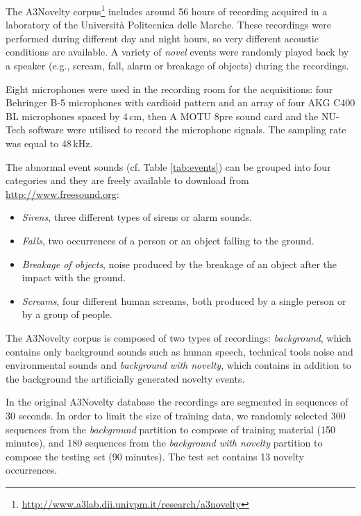 


The A3Novelty corpus\footnote{\label{note:a3}\url{http://www.a3lab.dii.univpm.it/research/a3novelty}} includes around 56 hours of recording acquired in a laboratory of the Università Politecnica delle Marche. 
These recordings were performed during different day and night hours, so very different acoustic conditions are available.
A variety of \emph{novel} events were randomly played back by a speaker (e.g., scream, fall, alarm or breakage of objects) during the recordings.

Eight microphones were used in the recording room for the acquisitions: four Behringer B-5 microphones with cardioid pattern and an
array of four AKG C400 BL microphones spaced by 4\,cm, then A MOTU 8pre sound card and the NU-Tech software were utilised 
to record the microphone signals. The sampling rate was equal to 48\,kHz.


The abnormal event sounds (cf.  Table \ref{tab:events}) can be grouped into four categories and they are freely available to download from \url{http://www.freesound.org}:
\begin{itemize}
	\item \textit{Sirens}, three different types of sirens or alarm sounds.
	\item \textit{Falls}, two occurrences of a person or an object falling to the ground.
	\item \textit{Breakage of objects}, noise produced by the breakage of an object after the impact with the ground.
	\item \textit{Screams}, four different human screams, both produced by a single person or by a group of people.
\end{itemize}


The A3Novelty corpus is composed of two types of recordings:
\emph{background}, which contains only background sounds such as human speech, technical tools noise and environmental sounds and \emph{background with novelty}, which contains in addition to the background the artificially generated novelty events.

In the original A3Novelty database the recordings are segmented in sequences of 30 seconds. In order to limit the size of training data, we randomly selected 300 sequences from the \emph{background} partition to compose of training material (150 minutes), and 180 sequences from the \emph{background with novelty} partition to compose the testing set (90 minutes). The test set contains 13 novelty occurrences.

